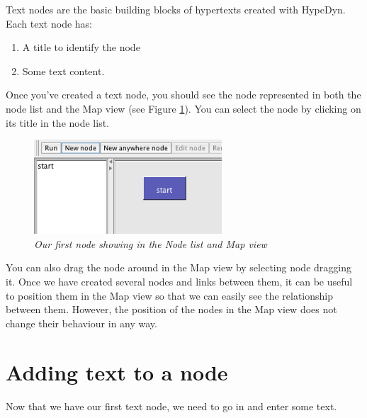 \documentclass{article}
\begin{document}
Text nodes are the basic building blocks of hypertexts created with HypeDyn.
Each text node has: 
\begin{enumerate}
  \item A title to identify the node
  \item Some text content.
\end{enumerate}

Once you've created a text node, you should see the node represented in both the
node list and the Map view (see Figure \ref{fig:first_node}). You can select the
node by clicking on its title in the node list.
 
\begin{figure}[ht]
  \centering \includegraphics[width=7cm]{images/hypedyn-tutorial-1-figure-4}
  \caption{\textit{Our first node showing in the Node list and Map view}}
  \label{fig:first_node}
\end{figure} 

You can also drag the node around in the Map view by selecting node dragging
it. Once we have created several nodes and links between them, it can be useful
to position them in the Map view so that we can easily see the relationship
between them. However, the position of the nodes in the Map view does
not change their behaviour in any way.

\section{Adding text to a node}

Now that we have our first text node, we need to go in and enter some text.
\end{document}
